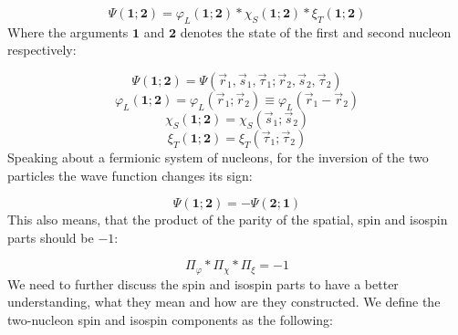 \begin{equation} \label{eq:2.31}
	\Psi \left( \boldsymbol{1}; \boldsymbol{2} \right)
	=
	\varphi_{L} \left( \boldsymbol{1}; \boldsymbol{2} \right)
	*
	\chi_{S} \left( \boldsymbol{1}; \boldsymbol{2} \right)
	*
	\xi_{T} \left( \boldsymbol{1}; \boldsymbol{2} \right)
\end{equation}
Where the arguments $\boldsymbol{1}$ and $\boldsymbol{2}$ denotes the state of the first and second nucleon respectively:

\begin{equation} \label{eq:2.32}
	\Psi \left( \boldsymbol{1}; \boldsymbol{2} \right)
	=
	\Psi \left( \vec{r}_{1}, \vec{s}_{1}, \vec{\tau}_{1}; \vec{r}_{2}, \vec{s}_{2}, \vec{\tau}_{2} \right)
\end{equation}
\begin{equation} \label{eq:2.33}
	\varphi_{L} \left( \boldsymbol{1}; \boldsymbol{2} \right)
	=
	\varphi_{L} \left( \vec{r}_{1}; \vec{r}_{2} \right)
	\equiv
	\varphi_{L} \left( \vec{r}_{1} - \vec{r}_{2} \right)
\end{equation}
\begin{equation} \label{eq:2.34}
	\chi_{S} \left( \boldsymbol{1}; \boldsymbol{2} \right)
	=
	\chi_{S} \left( \vec{s}_{1}; \vec{s}_{2} \right)
\end{equation}
\begin{equation} \label{eq:2.35}
	\xi_{T} \left( \boldsymbol{1}; \boldsymbol{2} \right)
	=
	\xi_{T} \left( \vec{\tau}_{1}; \vec{\tau}_{2} \right)
\end{equation}
Speaking about a fermionic system of nucleons, for the inversion of the two particles the wave function changes its sign:

\begin{equation} \label{eq:2.36}
	\Psi \left( \boldsymbol{1}; \boldsymbol{2} \right)
	=
	- \Psi \left( \boldsymbol{2}; \boldsymbol{1} \right)
\end{equation}
This also means, that the product of the parity of the spatial, spin and isospin parts should be $-1$:

\begin{equation} \label{eq:2.37}
	\Pi_{\varphi} * \Pi_{\chi} * \Pi_{\xi}
	=
	-1
\end{equation}
We need to further discuss the spin and isospin parts to have a better understanding, what they mean and how are they constructed. We define the two-nucleon spin and isospin components as the following:

